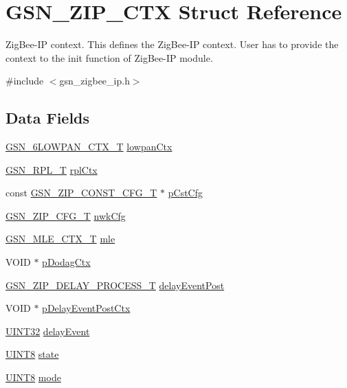 \hypertarget{a00440}{
\section{GSN\_\-ZIP\_\-CTX Struct Reference}
\label{a00440}
}


ZigBee-\/IP context. This defines the ZigBee-\/IP context. User has to provide the context to the init function of ZigBee-\/IP module.  




{\ttfamily \#include $<$gsn\_\-zigbee\_\-ip.h$>$}

\subsection*{Data Fields}
\begin{DoxyCompactItemize}
\item 
\hyperlink{a00019}{GSN\_\-6LOWPAN\_\-CTX\_\-T} \hyperlink{a00440_a5471b017312565942c51038afa3c7428}{lowpanCtx}
\item 
\hyperlink{a00192}{GSN\_\-RPL\_\-T} \hyperlink{a00440_a373ea62293885279791ea1559374aac8}{rplCtx}
\item 
const \hyperlink{a00439}{GSN\_\-ZIP\_\-CONST\_\-CFG\_\-T} $\ast$ \hyperlink{a00440_a101a462dccde755d187c3ef31ff31a82}{pCstCfg}
\item 
\hyperlink{a00438}{GSN\_\-ZIP\_\-CFG\_\-T} \hyperlink{a00440_a97bc48ebc9b6cd9d2cf5f4eaafe7a6d6}{nwkCfg}
\item 
\hyperlink{a00151}{GSN\_\-MLE\_\-CTX\_\-T} \hyperlink{a00440_af6ac1eebeeae7f32a274a7cd914f9bd8}{mle}
\item 
VOID $\ast$ \hyperlink{a00440_af31cb5b755e89e35cbdf543491bb5cc8}{pDodagCtx}
\item 
\hyperlink{a00618_a7f63a0d767866fd213452687d2666c67}{GSN\_\-ZIP\_\-DELAY\_\-PROCESS\_\-T} \hyperlink{a00440_a29e4d6bffd311d693fce3191c592236c}{delayEventPost}
\item 
VOID $\ast$ \hyperlink{a00440_afcc216c129528dccc51653661a14eaef}{pDelayEventPostCtx}
\item 
\hyperlink{a00660_gae1e6edbbc26d6fbc71a90190d0266018}{UINT32} \hyperlink{a00440_ada69a538b8d3e7311a343b91f2b30f86}{delayEvent}
\item 
\hyperlink{a00660_gab27e9918b538ce9d8ca692479b375b6a}{UINT8} \hyperlink{a00440_a6e9c4cbd32a1178b12f3a61f6855c896}{state}
\item 
\hyperlink{a00660_gab27e9918b538ce9d8ca692479b375b6a}{UINT8} \hyperlink{a00440_a7d61d79fa98a45545166420dec0d8f3d}{mode}

\end{DoxyCompactItemize}
